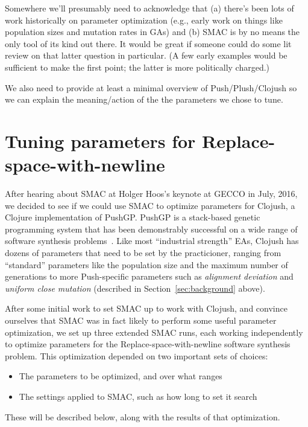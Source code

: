 Somewhere we'll presumably need to acknowledge that (a) there's been lots of
work historically on parameter optimization (e.g., early work on things like
population sizes and mutation rates in GAs) and (b) SMAC is by no means the
only tool of its kind out there. It would be great if someone could do some
lit review on that latter question in particular. (A few early examples would
be sufficient to make the first point; the latter is more politically charged.)

We also need to provide at least a minimal overview of Push/Plush/Clojush so
we can explain the meaning/action of the the parameters we chose to tune. 

\section{Tuning parameters for Replace-space-with-newline}
\label{sec:tuningRSWN}



After hearing about SMAC at Holger Hoos's keynote at GECCO in July, 2016, we
decided to see if we could use SMAC to optimize parameters for Clojush, a
Clojure implementation of PushGP. PushGP is a stack-based genetic programming
system that has been demonstrably successful on a wide range of software
synthesis problems~\cite{Helmuth:2015:GECCO}. Like most ``industrial
strength'' EAs, Clojush has dozens of parameters that need to be set by the
practicioner, ranging from ``standard'' parameters like the population size
and the maximum number of generations to more Push-specific parameters
such as \emph{alignment deviation} and \emph{uniform close mutation} (described
in Section~\ref{sec:background} above).

After some initial work to set SMAC up to work with Clojush, and convince
ourselves that SMAC was in fact likely to perform some useful parameter
optimization, we set up three extended SMAC runs, each working independently
to optimize parameters for the Replace-space-with-newline software synthesis 
problem.
This optimization depended on two important sets of choices:
\begin{itemize}
	\item The parameters to be optimized, and over what ranges
	\item The settings applied to SMAC, such as how long to set it search
\end{itemize}
These will be described below, along with the results of that optimization.

